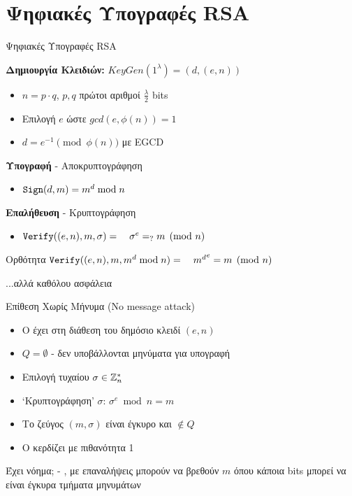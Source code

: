 \documentclass[handout]{beamer}
\begin{document}
\section{Ψηφιακές Υπογραφές RSA}
\begin{frame} {Ψηφιακές Υπογραφές RSA}
 
\textbf{Δημιουργία Κλειδιών:}
$KeyGen(1^{\lambda}) = (d,(e,n))$
\begin{itemize}
\item $n=p \cdot q$, $p,q$ πρώτοι αριθμοί $\frac{\lambda}{2}$ bits
\item Επιλογή $e$ ώστε $gcd(e,\phi(n))=1$
\item $d = e^{-1} \pmod{\phi(n)}$ με EGCD
\end{itemize}
\pause
\textbf{Υπογραφή} - Αποκρυπτογράφηση
\begin{itemize}
\item $\mathtt{Sign}(d, m) = m^d \bmod n$
\end{itemize}
\pause
\textbf{Επαλήθευση} - Κρυπτογράφηση
\begin{itemize}
\item $\verify((e,n), m, \sigma) = \ \ \ \sigma^e =_? m \pmod{n}$
\end{itemize} 
\pause
\begin{block}{Ορθότητα}
$\mathtt{Verify}((e,n), m, m^d \bmod{n})= \ \ \  {m^d}^e = m \pmod{n}$
\end{block}
\pause
\alert{...αλλά καθόλου ασφάλεια}
\end{frame}

\begin{frame}{Επίθεση Χωρίς Μήνυμα (No message attack)}
\begin{itemize}
\item O \adv έχει στη διάθεση του δημόσιο κλειδί $(e,n)$
\pause
\item $Q = \emptyset$ - δεν υποβάλλονται μηνύματα για υπογραφή
\pause
\item Επιλογή τυχαίου $\sigma \in \mathbb{Z}^*_n$
\pause
\item `Kρυπτογράφηση' $\sigma$: $\sigma^e \bmod n = m$
\pause
\item Το ζεύγος $(m,\sigma)$ είναι έγκυρο και $\not \in Q$
\pause
\item O \adv κερδίζει με πιθανότητα 1
\end{itemize}

\alert{Έχει νόημα;} - , με επαναλήψεις μπορούν να βρεθούν $m$ όπου κάποια bits μπορεί να είναι έγκυρα τμήματα μηνυμάτων
\end{frame}
\end{document}
